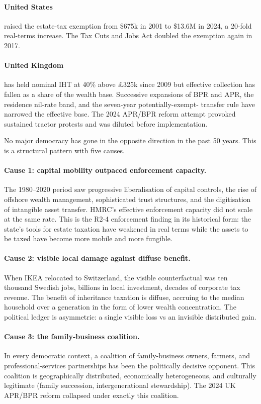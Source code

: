 \documentclass[11pt]{article}
\begin{document}
\paragraph{United States} raised the estate-tax exemption from
\$675k in 2001 to \$13.6M in 2024, a 20-fold real-terms increase.
The Tax Cuts and Jobs Act doubled the exemption again in 2017.

\paragraph{United Kingdom} has held nominal IHT at 40\% above
\pounds 325k since 2009 but effective collection has fallen as a
share of the wealth base.  Successive expansions of BPR and APR,
the residence nil-rate band, and the seven-year potentially-exempt-
transfer rule have narrowed the effective base.  The 2024 APR/BPR
reform attempt provoked sustained tractor protests and was diluted
before implementation.

No major democracy has gone in the opposite direction in the past
50 years.  This is a structural pattern with five causes.

\paragraph{Cause 1: capital mobility outpaced enforcement capacity.}
The 1980--2020 period saw progressive liberalisation of capital
controls, the rise of offshore wealth management, sophisticated
trust structures, and the digitisation of intangible asset
transfer.  HMRC's effective enforcement capacity did not scale at
the same rate.  This is the R2-4 enforcement finding in its
historical form: the state's tools for estate taxation have
weakened in real terms while the assets to be taxed have become
more mobile and more fungible.

\paragraph{Cause 2: visible local damage against diffuse benefit.}
When IKEA relocated to Switzerland, the visible counterfactual was
ten thousand Swedish jobs, billions in local investment, decades of
corporate tax revenue.  The benefit of inheritance taxation is
diffuse, accruing to the median household over a generation in
the form of lower wealth concentration.  The political ledger is
asymmetric: a single visible loss vs an invisible distributed gain.

\paragraph{Cause 3: the family-business coalition.}  In every
democratic context, a coalition of family-business owners,
farmers, and professional-services partnerships has been the
politically decisive opponent.  This coalition is geographically
distributed, economically heterogeneous, and culturally legitimate
(family succession, intergenerational stewardship).  The 2024 UK
APR/BPR reform collapsed under exactly this coalition.
\end{document}
